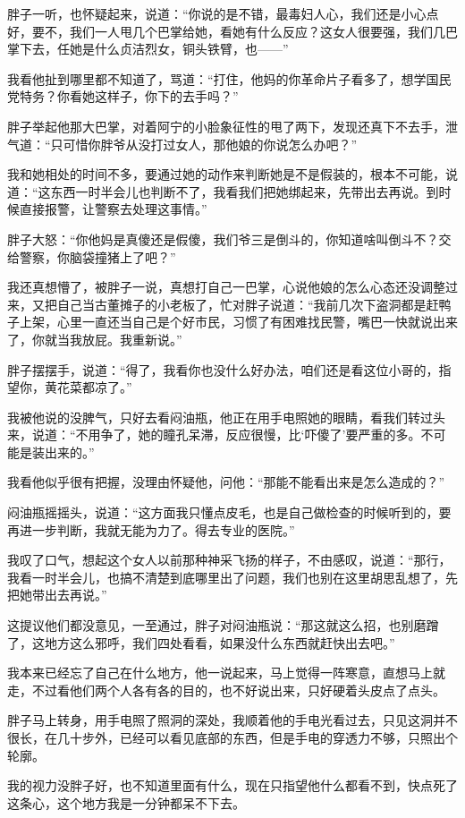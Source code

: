 胖子一听，也怀疑起来，说道：“你说的是不错，最毒妇人心，我们还是小心点好，要不，我们一人甩几个巴掌给她，看她有什么反应？这女人很要强，我们几巴掌下去，任她是什么贞洁烈女，铜头铁臂，也——”

我看他扯到哪里都不知道了，骂道：“打住，他妈的你革命片子看多了，想学国民党特务？你看她这样子，你下的去手吗？”

胖子举起他那大巴掌，对着阿宁的小脸象征性的甩了两下，发现还真下不去手，泄气道：“只可惜你胖爷从没打过女人，那他娘的你说怎么办吧？”

我和她相处的时间不多，要通过她的动作来判断她是不是假装的，根本不可能，说道：“这东西一时半会儿也判断不了，我看我们把她绑起来，先带出去再说。到时候直接报警，让警察去处理这事情。”

胖子大怒：“你他妈是真傻还是假傻，我们爷三是倒斗的，你知道啥叫倒斗不？交给警察，你脑袋撞猪上了吧？”

我还真想懵了，被胖子一说，真想打自己一巴掌，心说他娘的怎么心态还没调整过来，又把自己当古董摊子的小老板了，忙对胖子说道：“我前几次下盗洞都是赶鸭子上架，心里一直还当自己是个好市民，习惯了有困难找民警，嘴巴一快就说出来了，你就当我放屁。我重新说。”

胖子摆摆手，说道：“得了，我看你也没什么好办法，咱们还是看这位小哥的，指望你，黄花菜都凉了。”

我被他说的没脾气，只好去看闷油瓶，他正在用手电照她的眼睛，看我们转过头来，说道：“不用争了，她的瞳孔呆滞，反应很慢，比‘吓傻了’要严重的多。不可能是装出来的。”

我看他似乎很有把握，没理由怀疑他，问他：“那能不能看出来是怎么造成的？”

闷油瓶摇摇头，说道：“这方面我只懂点皮毛，也是自己做检查的时候听到的，要再进一步判断，我就无能为力了。得去专业的医院。”

我叹了口气，想起这个女人以前那种神采飞扬的样子，不由感叹，说道：“那行，我看一时半会儿，也搞不清楚到底哪里出了问题，我们也别在这里胡思乱想了，先把她带出去再说。”

这提议他们都没意见，一至通过，胖子对闷油瓶说：“那这就这么招，也别磨蹭了，这地方这么邪呼，我们四处看看，如果没什么东西就赶快出去吧。”

我本来已经忘了自己在什么地方，他一说起来，马上觉得一阵寒意，直想马上就走，不过看他们两个人各有各的目的，也不好说出来，只好硬着头皮点了点头。

胖子马上转身，用手电照了照洞的深处，我顺着他的手电光看过去，只见这洞并不很长，在几十步外，已经可以看见底部的东西，但是手电的穿透力不够，只照出个轮廓。

我的视力没胖子好，也不知道里面有什么，现在只指望他什么都看不到，快点死了这条心，这个地方我是一分钟都呆不下去。

